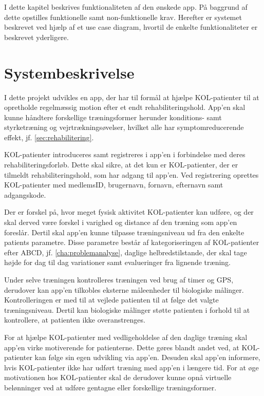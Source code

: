 I dette kapitel beskrives funktionaliteten af den ønskede app. På baggrund af dette opstilles funktionelle samt non-funktionelle krav. Herefter er systemet beskrevet ved hjælp af et use case diagram, hvortil de enkelte funktionaliteter er beskrevet yderligere. 

\section{Systembeskrivelse} \label{sec:systembeskrivelse}
I dette projekt udvikles en app, der har til formål at hjælpe KOL-patienter til at opretholde regelmæssig motion efter et endt rehabiliteringshold. App'en skal kunne håndtere forskellige træningsformer herunder konditions- samt styrketræning og vejrtrækningsøvelser, hvilket alle har symptomreducerende effekt, jf. \autoref{sec:rehabilitering}. 

KOL-patienter introduceres samt registreres i app'en i forbindelse med deres rehabiliteringsforløb. 
Dette skal sikre, at det kun er KOL-patienter, der er tilmeldt rehabiliteringshold, som har adgang til app'en. Ved registrering oprettes KOL-patienter med medlemsID, brugernavn, fornavn, efternavn samt adgangskode.  

Der er forskel på, hvor meget fysisk aktivitet KOL-patienter kan udføre, og der skal derved være forskel i varighed og distance af den træning som app'en foreslår. Dertil skal app'en kunne tilpasse træningsniveau ud fra den enkelte patients parametre. Disse parametre består af kategoriseringen af KOL-patienter efter ABCD, jf. \autoref{cha:problemanalyse}, daglige helbredstilstande, der skal tage højde for dag til dag variationer samt evalueringer fra lignende træning. 

Under selve træningen kontrolleres træningen ved brug af timer og GPS, derudover kan app'en tilkobles eksterne måleenheder til biologiske målinger. Kontrolleringen er med til at vejlede patienten til at følge det valgte træningsniveau. Dertil kan biologiske målinger støtte patienten i forhold til at kontrollere, at patienten ikke overanstrenges. 

For at hjælpe KOL-patienter med vedligeholdelse af den daglige træning skal app’en virke motiverende for patienterne. Dette gøres blandt andet ved, at KOL-patienter kan følge sin egen udvikling via app'en. Desuden skal app'en informere, hvis KOL-patienter ikke har udført træning med app'en i længere tid. For at øge motivationen hos KOL-patienter skal de derudover kunne opnå virtuelle belønninger ved at udføre gentagne eller forskellige træningsformer.\citep{Gade2007, Tricomi2016}

